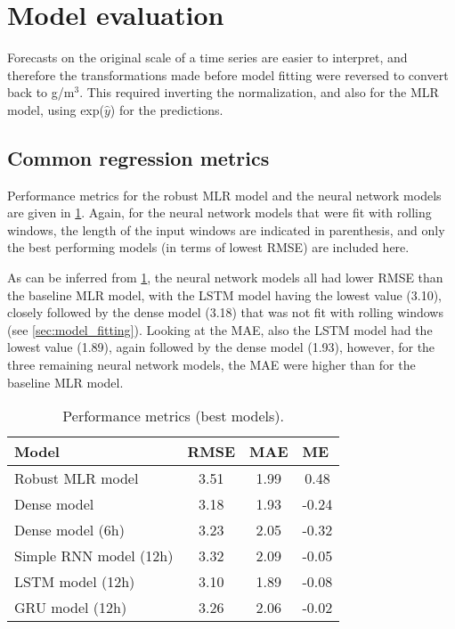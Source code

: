
\section{Model evaluation}
Forecasts on the original scale of a time series are easier to interpret, and therefore the transformations made before model fitting were reversed to convert back to \textmugreek g/m$^3$. This required inverting the normalization, and also for the MLR model, using exp($\hat{y}$) for the predictions. 
\subsection{Common regression metrics}
Performance metrics for the robust MLR model and the neural network models are given in \cref{tab:performance_metrics}. Again, for the neural network models that were fit with rolling windows, the length of the input windows are indicated in parenthesis, and only the best performing models (in terms of lowest RMSE) are included here. 

As can be inferred from \cref{tab:performance_metrics}, the neural network models all had lower RMSE than the baseline MLR model, with the LSTM model having the lowest value (3.10), closely followed by the dense model (3.18) that was not fit with rolling windows (see \vref{sec:model_fitting}). Looking at the MAE, also the LSTM model had the lowest value (1.89), again followed by the dense model (1.93), however, for the three remaining neural network models, the MAE were higher than for the baseline MLR model. 
\begin{table}[h]
\small
\centering
\caption{Performance metrics (best models). }
\label{tab:performance_metrics}
\begin{tabular}{@{}lccc@{}}
\toprule
Model            & \multicolumn{1}{l}{RMSE} & \multicolumn{1}{l}{MAE} & \multicolumn{1}{l}{ME} \\ \midrule
Robust MLR model & 3.51                     & 1.99                    & 0.48                   \\
Dense model      & 3.18                     & 1.93                    & -0.24                  \\
Dense model (6h) & 3.23                     & 2.05                    & -0.32                  \\
Simple RNN model (12h)  & 3.32                     & 2.09                    & -0.05                  \\
LSTM model (12h) & 3.10                     & 1.89                    & -0.08                  \\
GRU model (12h)  & 3.26                     & 2.06                    & -0.02                  \\ \bottomrule
\end{tabular}
\end{table}

